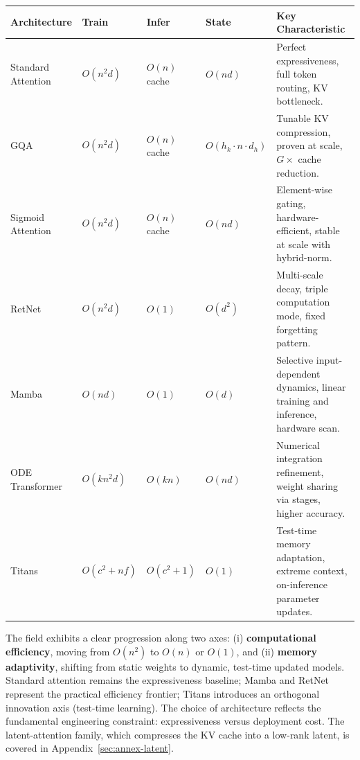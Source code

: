 \small
\begin{longtable}{p{2.0cm}p{1.8cm}p{1.6cm}p{1.6cm}p{4.5cm}}
\toprule
\textbf{Architecture} & \textbf{Train} & \textbf{Infer} & \textbf{State} & \textbf{Key Characteristic} \\
\midrule
\endhead
Standard Attention & $O(n^2 d)$ & $O(n)$ cache & $O(nd)$ & Perfect expressiveness, full token routing, KV bottleneck. \\
GQA & $O(n^2 d)$ & $O(n)$ cache & $O(h_k \cdot n \cdot d_h)$ & Tunable KV compression, proven at scale, $G \times$ cache reduction. \\
Sigmoid Attention & $O(n^2 d)$ & $O(n)$ cache & $O(nd)$ & Element-wise gating, hardware-efficient, stable at scale with hybrid-norm. \\
RetNet & $O(n^2 d)$ & $O(1)$ & $O(d^2)$ & Multi-scale decay, triple computation mode, fixed forgetting pattern. \\
Mamba & $O(nd)$ & $O(1)$ & $O(d)$ & Selective input-dependent dynamics, linear training and inference, hardware scan. \\
ODE Transformer & $O(kn^2 d)$ & $O(kn)$ & $O(nd)$ & Numerical integration refinement, weight sharing via stages, higher accuracy. \\
Titans & $O(c^2 + nf)$ & $O(c^2 + 1)$ & $O(1)$ & Test-time memory adaptation, extreme context, on-inference parameter updates. \\
\bottomrule
\end{longtable}
\normalsize

The field exhibits a clear progression along two axes: (i) \textbf{computational efficiency}, moving from $O(n^2)$ to $O(n)$ or $O(1)$, and (ii) \textbf{memory adaptivity}, shifting from static weights to dynamic, test-time updated models. Standard attention remains the expressiveness baseline; Mamba and RetNet represent the practical efficiency frontier; Titans introduces an orthogonal innovation axis (test-time learning). The choice of architecture reflects the fundamental engineering constraint: expressiveness versus deployment cost. The latent-attention family, which compresses the KV cache into a low-rank latent, is covered in Appendix~\ref{sec:annex-latent}.